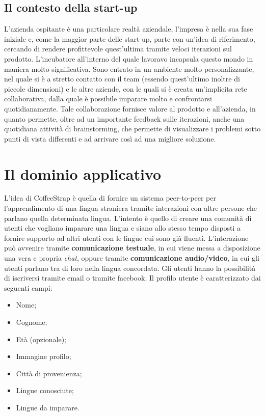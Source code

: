\subsection{Il contesto della start-up}

L'azienda ospitante è una particolare realtà aziendale, l'impresa è nella sua fase iniziale e, come la maggior parte delle start-up, parte con un'idea di riferimento, cercando di rendere profittevole quest'ultima tramite veloci iterazioni sul prodotto. L'incubatore all'interno del quale lavoravo incapsula questo mondo in maniera molto significativa. Sono entrato in un ambiente molto personalizzante, nel quale si è a stretto contatto con il team (essendo quest'ultimo inoltre di piccole dimensioni) e le altre aziende, con le quali si è creata un'implicita rete collaborativa, dalla quale è possibile imparare molto e confrontarsi quotidianamente. Tale collaborazione fornisce valore al prodotto e all'azienda, in quanto permette, oltre ad un importante feedback sulle iterazioni, anche una quotidiana attività di \gls{brainstorming}, che permette di visualizzare i problemi sotto punti di vista differenti e ad arrivare così ad una migliore soluzione.

\section{Il dominio applicativo}

L'idea di CoffeeStrap è quella di fornire un sistema \gls{peer-to-peer} per l'apprendimento di una lingua straniera tramite interazioni con altre persone che parlano quella determinata lingua. L'intento è quello di creare una comunità di utenti che vogliano imparare una lingua e siano allo stesso tempo disposti a fornire supporto ad altri utenti con le lingue cui sono già fluenti. L'interazione può avvenire tramite \textbf{comunicazione testuale}, in cui viene messa a disposizione una vera e propria \textit{chat}, oppure tramite \textbf{comunicazione audio/video}, in cui gli utenti parlano tra di loro nella lingua concordata. Gli utenti hanno la possibilità di iscriversi tramite email o tramite facebook. Il profilo utente è caratterizzato dai seguenti campi:

\begin{itemize}

\item Nome;
\item Cognome;
\item Età (opzionale);
\item Immagine profilo;
\item Città di provenienza;
\item Lingue conosciute;
\item Lingue da imparare.

\end{itemize}

